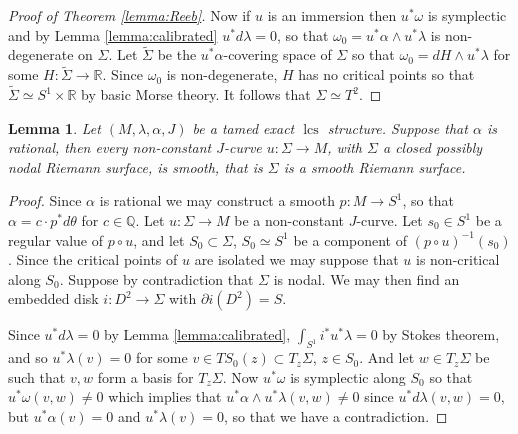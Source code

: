 \documentclass{amsart}
\numberwithin{equation}{section}
\newtheorem{lemma}[equation]{Lemma}
\theoremstyle{definition}
\theoremstyle{remark}
\DeclareMathOperator{\image}{\mathrm{image}}
\DeclareMathOperator{\lcs}{lcs}
\begin{document}
\begin{proof} [Proof of Theorem \ref{lemma:Reeb}]
Now if $u$ is an immersion then $u ^{*}\omega$ is symplectic and by Lemma \ref{lemma:calibrated} $u ^{*}d\lambda = 0 $, so that $\omega _{0}= u ^{*} \alpha \wedge u ^{*} \lambda$ is non-degenerate on $\Sigma$. Let $\widetilde{\Sigma}$ be the $u ^{*} \alpha$-covering space of $\Sigma$ so that $\omega _{0} = dH \wedge u ^{*} \lambda $ for some $H: \widetilde{\Sigma} \to \mathbb{R} $. Since $\omega _{0} $ is non-degenerate, $H$ has no critical points so that $\widetilde{\Sigma} \simeq S ^{1} \times \mathbb{R}  $ by basic Morse theory. It follows that $\Sigma \simeq T ^{2} $.
\end{proof}
\begin{lemma}
    \label{lemma:rational} 
    Let $(M,\lambda, \alpha, J)$ be a tamed exact $\lcs$ structure. Suppose that $\alpha$ is rational, then every non-constant $J$-curve $u: \Sigma \to M$, with $\Sigma$ a closed possibly nodal Riemann surface, is smooth, that is $\Sigma$ is a smooth Riemann surface.
  \end{lemma}
\begin{proof} 
Since $\alpha$ is rational we may construct a smooth $p: M \to S ^{1} $,   so that $\alpha=c \cdot p ^{*} d\theta $ for $c \in \mathbb{Q}$. 
Let $u: \Sigma \to M$ be a non-constant $J$-curve. Let $s _{0}  \in S ^{1}  $ be a regular value of $p \circ u$, and let $S _{0}   \subset \Sigma $, $S _{0}  \simeq S ^{1}  $ be a component of $(p \circ u) ^{-1} (s _{0} ) $. Since the critical points of $u$ are isolated we may suppose that $u$ is non-critical along $S _{0} $.   Suppose by contradiction that $\Sigma$ is nodal. We may then find an embedded disk $i: D ^{2} \to \Sigma $ with $\partial i (D ^{2} )= S$. 

Since $u ^{*} d\lambda = 0 $ by Lemma \ref{lemma:calibrated}, $\int _{S ^{1}} i ^{*} u ^{*} \lambda =0 $ by Stokes theorem, and so $u ^{*} \lambda (v) = 0$ for some $v \in TS _{0} (z) \subset T _{z} \Sigma  $, $z \in S _{0} $. And let $w \in T _{z} \Sigma $ be such that $v,w$ form a basis for $T _{z} \Sigma $.
Now $u ^{*} \omega$ is symplectic along $S _{0} $ so that $u ^{*} \omega (v,w) \neq 0 $ which implies that $u ^{*} \alpha \wedge u ^{*} \lambda (v,w) \neq 0$ since $u ^{*} d\lambda (v,w) =0 $, but $u ^{*} \alpha (v)=0$ and $u ^{*} \lambda (v) =0 $, so that we have a contradiction.
\end{proof}
\end{document}
